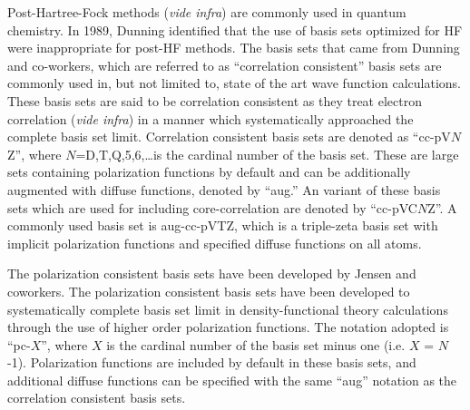 \vspace{3mm}
\vspace{1mm}

Post-Hartree-Fock methods (\emph{vide infra}) are commonly used in quantum
chemistry. In 1989, Dunning\cite{Dunning1989, Kendall1992, Woon1994} identified
that the use of basis sets optimized for HF were inappropriate for post-HF
methods. The basis sets that came from Dunning and co-workers, which are
referred to as ``correlation consistent'' basis sets are commonly used in, but
not limited to, state of the art wave function calculations. These basis sets
are said to be correlation consistent as they treat electron correlation
(\emph{vide infra}) in a manner which systematically approached the complete
basis set limit. Correlation consistent basis sets are denoted as
``cc-pV$N$Z'', where $N$=D,T,Q,5,6,\ldots is the cardinal number of the basis
set. These are large sets containing polarization functions by default and can
be additionally augmented with diffuse functions, denoted by ``aug.'' An
variant of these basis sets which are used for including core-correlation are
denoted by ``cc-pVC$N$Z''.\cite{Peterson2002} A commonly used basis set is
aug-cc-pVTZ, which is a triple-zeta basis set with implicit polarization
functions and specified diffuse functions on all atoms.

\vspace{3mm}
\vspace{1mm}

The polarization consistent basis sets have been developed by Jensen and
coworkers.\cite{Jensen2001, Jensen2002, Jensen2002a, Jensen2003} The
polarization consistent basis sets have been developed to systematically
complete basis set limit in density-functional theory calculations through the
use of higher order polarization functions. The notation adopted is ``pc-$X$'',
where $X$ is the cardinal number of the basis set minus one (i.e. $X$ = $N$-1).
Polarization functions are included by default in these basis sets, and
additional diffuse functions can be specified with the same ``aug'' notation as
the correlation consistent basis sets.

\vspace{3mm}
\vspace{1mm}

